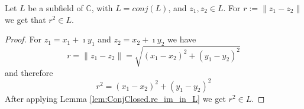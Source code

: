 \begin{lemma}
    \label{lem:ConjClosed.distSq_L}
    \leanok
    Let $L$ be a subfield of $\mathbb{C}$, with $L = conj(L)$, and $z_1, z_2 \in L$.
    For $r := \|z_1-z_2\|$ we get that $r^2 \in L$.
\end{lemma}
\begin{proof}
    For $z_1 = x_1 + \imath y_1$ and $z_2 = x_2 + \imath y_2$ we have
    \begin{equation*}
        r = \|z_1 - z_2\| = \sqrt{(x_1 - x_2)^2 + (y_1 - y_2)^2}
    \end{equation*}
    and therefore
    \begin{equation*}
        r^2 = (x_1 - x_2)^2 + (y_1 - y_2)^2 
    \end{equation*}
    After applying Lemma \ref{lem:ConjClosed.re_im_in_L} we get $r^2 \in L$.
\end{proof}

